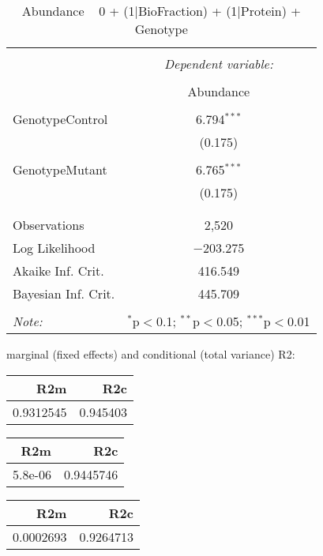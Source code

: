 \documentclass[11pt]{report}
\begin{document}
\begin{table}[!htbp] \centering 
  \caption{Abundance ~ 0 + (1|BioFraction) + (1|Protein) + Genotype} 
  \label{} 
\begin{tabular}{@{\extracolsep{5pt}}lc} 
\\[-1.8ex]\hline 
\hline \\[-1.8ex] 
 & \multicolumn{1}{c}{\textit{Dependent variable:}} \\ 
\cline{2-2} 
\\[-1.8ex] & Abundance \\ 
\hline \\[-1.8ex] 
 GenotypeControl & 6.794$^{***}$ \\ 
  & (0.175) \\ 
  & \\ 
 GenotypeMutant & 6.765$^{***}$ \\ 
  & (0.175) \\ 
  & \\ 
\hline \\[-1.8ex] 
Observations & 2,520 \\ 
Log Likelihood & $-$203.275 \\ 
Akaike Inf. Crit. & 416.549 \\ 
Bayesian Inf. Crit. & 445.709 \\ 
\hline 
\hline \\[-1.8ex] 
\textit{Note:}  & \multicolumn{1}{r}{$^{*}$p$<$0.1; $^{**}$p$<$0.05; $^{***}$p$<$0.01} \\ 
\end{tabular} 
\end{table} 
marginal (fixed effects) and conditional (total variance) R2:

\begin{tabular}{r|r}
\hline
R2m & R2c\\
\hline
0.9312545 & 0.945403\\
\hline
\end{tabular}

\begin{tabular}{r|r}
\hline
R2m & R2c\\
\hline
5.8e-06 & 0.9445746\\
\hline
\end{tabular}

\begin{tabular}{r|r}
\hline
R2m & R2c\\
\hline
0.0002693 & 0.9264713\\
\hline
\end{tabular}
\end{document}
